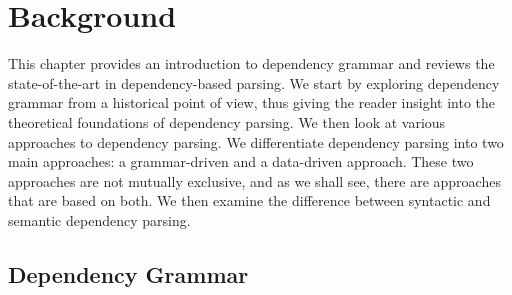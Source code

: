 \chapter{Background}
\label{chap:background}

This chapter provides an introduction to dependency grammar and reviews the state-of-the-art in
dependency-based parsing. We start by exploring dependency grammar from a historical point 
of view, thus giving the reader insight into the theoretical foundations of dependency parsing. 
We then look at various approaches to dependency parsing. We differentiate dependency 
parsing into two main approaches: a grammar-driven and a data-driven approach. 
These two approaches are not mutually exclusive, and as we shall see, there are approaches
that are based on both. We then examine the difference between syntactic and semantic dependency
parsing.

\section{Dependency Grammar}
